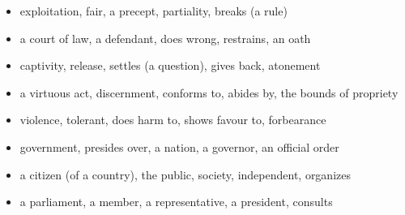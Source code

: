 \begin{itemize}
\raggedright
  \item exploitation, fair, a precept, partiality, breaks (a rule)
  \item a court of law, a defendant, does wrong, restrains, an oath
  \item captivity, release, settles (a question), gives back, atonement
  \item a virtuous act, discernment, conforms to, abides by, the bounds of propriety
  \item violence, tolerant, does harm to, shows favour to, forbearance
  \item government, presides over, a nation, a governor, an official order
  \item a citizen (of a country), the public, society, independent, organizes
  \item a parliament, a member, a representative, a president, consults
\end{itemize}

